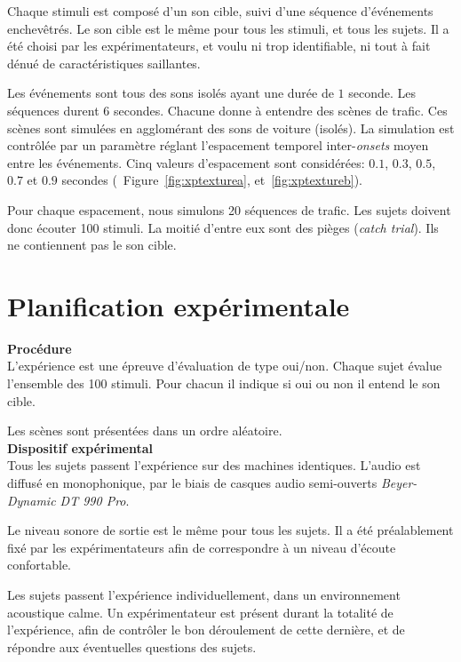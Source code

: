Chaque stimuli est composé d'un son cible, suivi d'une séquence d'événements enchevêtrés. Le son cible est le même pour tous les stimuli, et tous les sujets. Il a été choisi par les expérimentateurs, et voulu ni trop identifiable, ni tout à fait dénué de caractéristiques saillantes. 

Les événements sont tous des sons isolés ayant une durée de $1$ seconde. Les séquences durent 6 secondes. Chacune donne à entendre des scènes de trafic. Ces scènes sont simulées en agglomérant des sons de voiture (isolés). La simulation est contrôlée par un paramètre réglant l'espacement temporel inter-\emph{onsets} moyen entre les événements. Cinq valeurs d'espacement sont considérées: $0.1$, $0.3$, $0.5$, $0.7$ et $0.9$ secondes (\cf~Figure~\ref{fig:xptexturea}, et~\ref{fig:xptextureb}). 

Pour chaque espacement, nous simulons 20 séquences de trafic. Les sujets doivent donc écouter 100 stimuli. La moitié d'entre eux sont des pièges (\emph{catch trial}). Ils ne contiennent pas le son cible.

\section{Planification expérimentale}

{\setlength{\parindent}{0cm}\textbf{Procédure}} \\ 

L'expérience est une épreuve d'évaluation de type oui/non. Chaque sujet évalue l'ensemble des 100 stimuli. Pour chacun il indique si oui ou non il entend le son cible.

Les scènes sont présentées dans un ordre aléatoire.  \\

{\setlength{\parindent}{0cm}\textbf{Dispositif expérimental}} \\

Tous les sujets passent l'expérience sur des machines identiques. L'audio est diffusé en monophonique, par le biais de casques audio semi-ouverts \emph{Beyer-Dynamic DT 990 Pro}. 

Le niveau sonore de sortie est le même pour tous les sujets. Il a été préalablement fixé par les expérimentateurs afin de correspondre à un niveau d'écoute confortable.

Les sujets passent l'expérience individuellement, dans un environnement acoustique calme. Un expérimentateur est présent durant la totalité de l'expérience, afin de contrôler le bon déroulement de cette dernière, et de répondre aux éventuelles questions des sujets. \\

